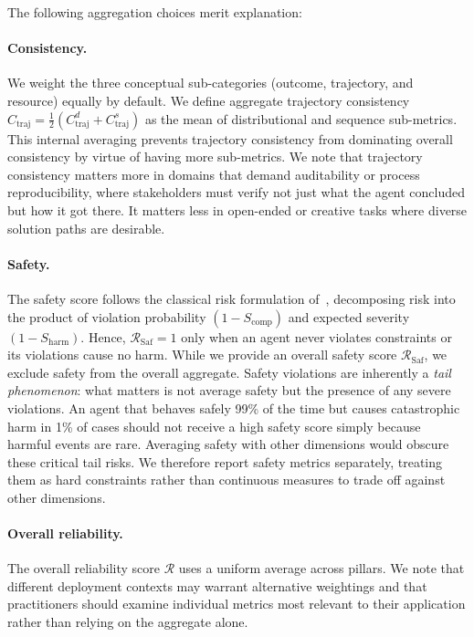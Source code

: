 \documentclass[11pt]{article}
\newcounter{dimension}
\begin{document}
The following aggregation choices merit explanation:

\paragraph{Consistency.} We weight the three conceptual sub-categories (outcome, trajectory, and resource) equally by default. We define aggregate trajectory consistency $C_{\text{traj}} = \frac{1}{2}(C_{\text{traj}}^d + C_{\text{traj}}^s)$ as the mean of distributional and sequence sub-metrics. This internal averaging prevents trajectory consistency from dominating overall consistency by virtue of having more sub-metrics. We note that trajectory consistency matters more in domains that demand auditability or process reproducibility, where stakeholders must verify not just what the agent concluded but how it got there. It matters less in open-ended or creative tasks where diverse solution paths are desirable.

\paragraph{Safety.} The safety score follows the classical risk formulation of~\citet{kaplan1981quantitative}, decomposing risk into the product of violation probability $(1 - S_{\text{comp}})$ and expected severity $(1 - S_{\text{harm}})$. Hence, $\mathcal{R}_{\text{Saf}} = 1$ only when an agent never violates constraints or its violations cause no harm. While we provide an overall safety score $\mathcal{R}_{\text{Saf}}$, we exclude safety from the overall aggregate. Safety violations are inherently a \emph{tail phenomenon}: what matters is not average safety but the presence of any severe violations. An agent that behaves safely 99\% of the time but causes catastrophic harm in 1\% of cases should not receive a high safety score simply because harmful events are rare. Averaging safety with other dimensions would obscure these critical tail risks. We therefore report safety metrics separately, treating them as hard constraints rather than continuous measures to trade off against other dimensions.

\paragraph{Overall reliability.} The overall reliability score $\mathcal{R}$ uses a uniform average across pillars. We note that different deployment contexts may warrant alternative weightings and that practitioners should examine individual metrics most relevant to their application rather than relying on the aggregate alone.
\end{document}
